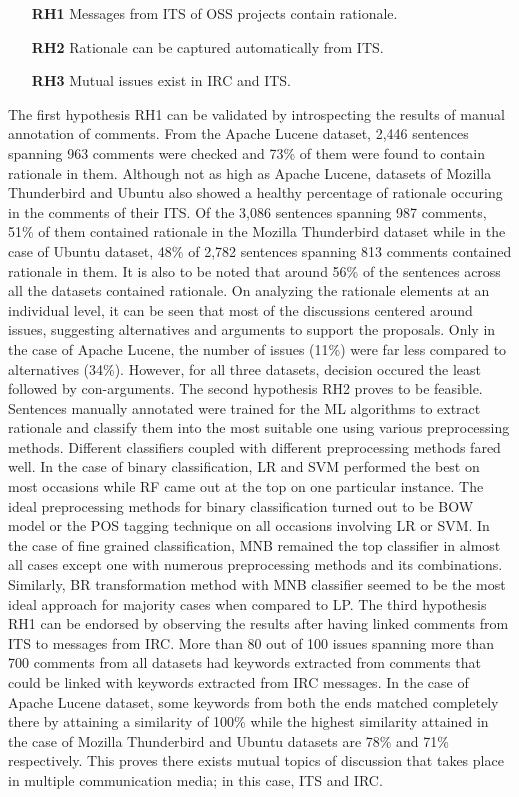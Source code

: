 \documentclass[a4paper,12pt,twoside]{report}
\begin{document}
\begin{itemize}
\item[\textbf{RH1}] Messages from ITS of OSS projects contain rationale.
\item[\textbf{RH2}] Rationale can be captured automatically from ITS.
\item[\textbf{RH3}] Mutual issues exist in IRC and ITS.
\end{itemize}

The first hypothesis RH1 can be validated by introspecting the results of manual annotation of comments. From the Apache Lucene dataset, 2,446 sentences spanning 963 comments were checked and 73\% of them were found to contain rationale in them. Although not as high as Apache Lucene, datasets of Mozilla Thunderbird and Ubuntu also showed a healthy percentage of rationale occuring in the comments of their ITS. Of the 3,086 sentences spanning 987 comments, 51\% of them contained rationale in the Mozilla Thunderbird dataset while in the case of Ubuntu dataset, 48\% of 2,782 sentences spanning 813 comments contained rationale in them. It is also to be noted that around 56\% of the sentences across all the datasets contained rationale. On analyzing the rationale elements at an individual level, it can be seen that most of the discussions centered around issues, suggesting alternatives and arguments to support the proposals. Only in the case of Apache Lucene, the number of issues (11\%) were far less compared to alternatives (34\%). However, for all three datasets, decision occured the least followed by con-arguments. 
\bigbreak
The second hypothesis RH2 proves to be feasible. Sentences manually annotated were trained for the ML algorithms to extract rationale and classify them into the most suitable one using various preprocessing methods. Different classifiers coupled with different preprocessing methods fared well. In the case of binary classification, LR and SVM performed the best on most occasions while RF came out at the top on one particular instance. The ideal preprocessing methods for binary classification turned out to be BOW model or the POS tagging technique on all occasions involving LR or SVM. In the case of fine grained classification, MNB remained the top classifier in almost all cases except one with numerous preprocessing methods and its combinations. Similarly, BR transformation method with MNB classifier seemed to be the most ideal approach for majority cases when compared to LP. 
\bigbreak
The third hypothesis RH1 can be endorsed by observing the results after having linked comments from ITS to messages from IRC. More than 80 out of 100 issues spanning more than 700 comments from all datasets had keywords extracted from comments that could be linked with keywords extracted from IRC messages. In the case of Apache Lucene dataset, some keywords from both the ends matched completely there by attaining a similarity of 100\% while the highest similarity attained in the case of Mozilla Thunderbird and Ubuntu datasets are 78\% and 71\% respectively. This proves there exists mutual topics of discussion that takes place in multiple communication media; in this case, ITS and IRC. 
\end{document}
